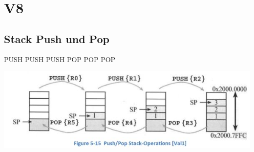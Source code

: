 \section{V8}
\subsection{Stack Push und Pop}
\begin{multicols}{2}
 \begin{minipage}{3cm}
     PUSH \newline
     PUSH \newline
     PUSH \newline
     POP \newline
     POP \newline
     POP \newline
 \end{minipage}
 \begin{minipage}{\linewidth}
    \includegraphics[width=1.5\linewidth]{images/stackpushpop}  
        \end{minipage}
\end{multicols}

